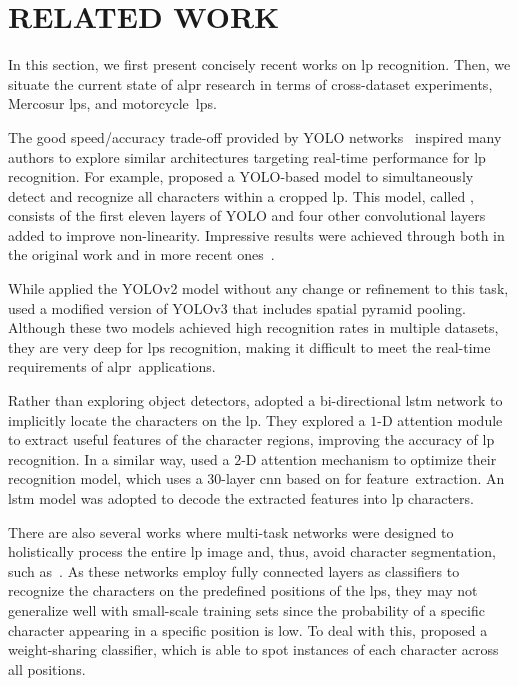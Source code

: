 \section{\uppercase{Related Work}}
\label{sec:related_work}

In this section, we first present  concisely recent works on \gls*{lp} recognition.
Then, we situate the current state of \gls*{alpr} research in terms of cross-dataset experiments, Mercosur \glspl*{lp}, and motorcycle~\glspl*{lp}.

The good speed/accuracy trade-off provided by YOLO networks~\citep{redmon2016yolo,bochkovskiy2020yolov4} inspired many authors to explore similar architectures targeting real-time performance for \gls*{lp} recognition.
For example, \cite{silva2020realtime} proposed a YOLO-based model to simultaneously detect and recognize all characters within a cropped \gls*{lp}. This model, called \crnet, consists of the first eleven layers of YOLO and four other convolutional layers added to improve non-linearity.
Impressive results were achieved through \crnet both in the original work and in more recent ones~\citep{laroca2021efficient,oliveira2021vehicle,silva2022flexible}.

While \cite{kessentini2019twostage} applied the YOLOv2 model without any change or refinement to this task, \cite{henry2020multinational} used a modified version of YOLOv3 that includes spatial pyramid pooling.
Although these two models achieved high recognition rates in multiple datasets, they are very deep for \glspl*{lp} recognition, making it difficult to meet the real-time requirements of \gls*{alpr}~applications.

Rather than exploring object detectors, \cite{zou2020robust} adopted a bi-directional \gls*{lstm} network to implicitly locate the characters on the \gls*{lp}.
They explored a $1$-D attention module to extract useful features of the character regions, improving the accuracy of \gls*{lp} recognition.
In a similar way, \cite{zhang2021robust_attentional} used a $2$-D attention mechanism to optimize their recognition model, which uses a 30-layer \gls*{cnn} based on \xception for feature~extraction.
An \gls*{lstm} model was adopted to decode the extracted features into \gls*{lp} characters.

There are also several works where multi-task networks were designed to holistically process the entire \gls*{lp} image and, thus, avoid character segmentation, such as~\citep{spanhel2017holistic,goncalves2019multitask}.
As these networks employ fully connected layers as classifiers to recognize the characters on the predefined positions of the \glspl*{lp}, they may not generalize well with small-scale training sets since the probability of a specific character appearing in a specific position is low.
To deal with this, \cite{wang2022rethinking} proposed a weight-sharing classifier, which is able to spot instances of each character across all positions.

